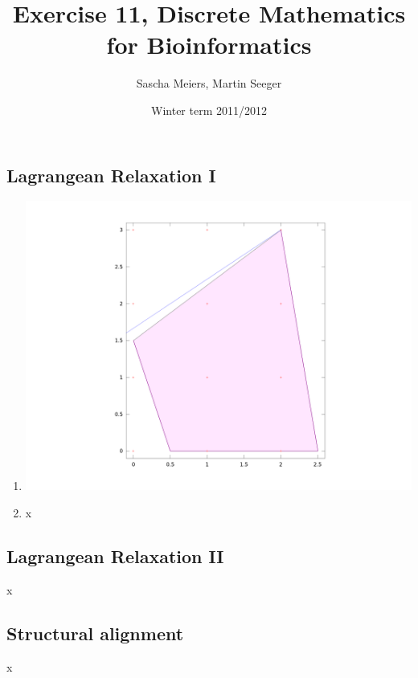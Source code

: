 \documentclass[a4paper, oneside]{scrartcl}
\author{Sascha Meiers, Martin Seeger}
\title{Exercise 11, Discrete Mathematics for Bioinformatics}
\date{Winter term 2011/2012}
\begin{document}
\maketitle


\subsection{Lagrangean Relaxation I}

\renewcommand{\labelenumi}{\alph{enumi})}
\begin{enumerate}
  \item 
\begin{center}
\includegraphics[width=\textwidth]{ex11_1_a_1.png}
\end{center}

  \item x
\end{enumerate}

\subsection{Lagrangean Relaxation II}

x

\subsection{Structural alignment}

x
\end{document}
